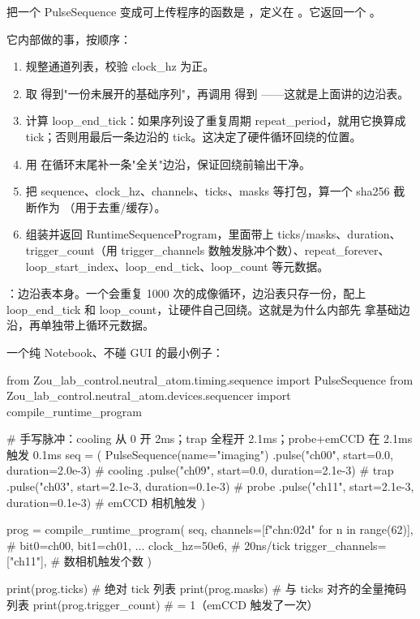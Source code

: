 \documentclass[11pt,oneside,openany]{book}
\begin{document}
把一个 PulseSequence 变成可上传程序的函数是 ，定义在 。它返回一个 。

它内部做的事，按顺序：
\begin{enumerate}
\item 规整通道列表，校验 clock\_hz 为正。
\item 取  得到"一份未展开的基础序列"，再调用  得到 ——这就是上面讲的边沿表。
\item 计算 loop\_end\_tick：如果序列设了重复周期 repeat\_period，就用它换算成 tick；否则用最后一条边沿的 tick。这决定了硬件循环回绕的位置。
\item 用  在循环末尾补一条"全关"边沿，保证回绕前输出干净。
\item 把 sequence、clock\_hz、channels、ticks、masks 等打包，算一个 sha256 截断作为 （用于去重/缓存）。
\item 组装并返回 RuntimeSequenceProgram，里面带上 ticks/masks、duration、trigger\_count（用 trigger\_channels 数触发脉冲个数）、repeat\_forever、loop\_start\_index、loop\_end\_tick、loop\_count 等元数据。
\end{enumerate}

：边沿表本身。一个会重复 1000 次的成像循环，边沿表只存一份，配上 loop\_end\_tick 和 loop\_count，让硬件自己回绕。这就是为什么内部先  拿基础边沿，再单独带上循环元数据。

一个纯 Notebook、不碰 GUI 的最小例子：

\begin{codeblock}[Python]
from Zou_lab_control.neutral_atom.timing.sequence import PulseSequence
from Zou_lab_control.neutral_atom.devices.sequencer import compile_runtime_program

# 手写脉冲：cooling 从 0 开 2ms；trap 全程开 2.1ms；probe+emCCD 在 2.1ms 触发 0.1ms
seq = (
    PulseSequence(name="imaging")
    .pulse("ch00", start=0.0,    duration=2.0e-3)   # cooling
    .pulse("ch09", start=0.0,    duration=2.1e-3)   # trap
    .pulse("ch03", start=2.1e-3, duration=0.1e-3)   # probe
    .pulse("ch11", start=2.1e-3, duration=0.1e-3)   # emCCD 相机触发
)

prog = compile_runtime_program(
    seq,
    channels=[f"ch{n:02d}" for n in range(62)],   # bit0=ch00, bit1=ch01, ...
    clock_hz=50e6,                                  # 20ns/tick
    trigger_channels=["ch11"],                      # 数相机触发个数
)

print(prog.ticks)          # 绝对 tick 列表
print(prog.masks)          # 与 ticks 对齐的全量掩码列表
print(prog.trigger_count)  # = 1（emCCD 触发了一次）
\end{codeblock}
\end{document}
